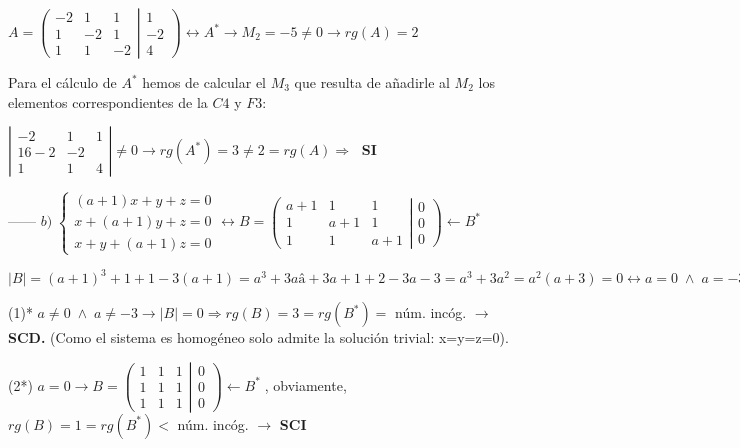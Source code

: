 \begin{proofw}
\noindent $A= \left( \begin{matrix} \boxed{-2}&\boxed{1}&1\\\boxed{1}&\boxed{-2}&1\\1&1&-2 \end{matrix} \right| \left. \begin{matrix} 1\\-2\\4 \end{matrix} \right) \leftrightarrow A^* \to \boxed{M_2}=-5\neq 0 \to rg(A)=2  $ 

Para el cálculo de $A^*$ hemos de calcular el $M_3$ que resulta de añadirle al $M_2$ los elementos correspondientes de la $C4$ y $F3$:

\noindent $\left| \begin{matrix} -2&1&1\\16-2&-2\\1&1&4 \end{matrix} \right|\neq 0 \to rg(A^*)=3 \neq 2 = rg(A) \Rightarrow\; $ \textbf{SI}


\noindent ------ \small{$ b)\; \begin{cases}   (a+1)x+y+z=0\\x+(a+1)y+z=0\\x+y+(a+1)z=0       \end{cases} \leftrightarrow  B=\left( \begin{matrix} a+1&1&1\\1&a+1&1\\1&1&a+1 \end{matrix} \right| \left. \begin{matrix} 0\\0\\0 \end{matrix} \right) \leftarrow B^*  $}

\noindent \normalsize{$|B|=(a+1)^3 +1+1-3(a+1)=a^3+3aâ+3a+1+2-3a-3= a^3+3a^2=a^2(a+3)=0 \leftrightarrow a=0 \; \wedge \; a=-3$}

\noindent (1)* $a\neq 0 \; \wedge \; a\neq -3 \to |B|=0 \Rightarrow rg(B)=3=rg(B^*)=$ núm. incóg. $\to $ \textbf{ SCD. }  \textcolor{gris}{ (Como el sistema es homogéneo solo admite la solución trivial: x=y=z=0).}

\noindent (2*) $a=0 \to  B=\left( \begin{matrix} 1&1&1\\1&1&1\\1&1&1 \end{matrix} \right| \left. \begin{matrix} 0\\0\\0 \end{matrix} \right) \leftarrow B^*  \;$, obviamente, $rg(B)=1=rg(B^*)<$ núm. incóg. $\to$ \textbf{ SCI}


\end{proofw}
